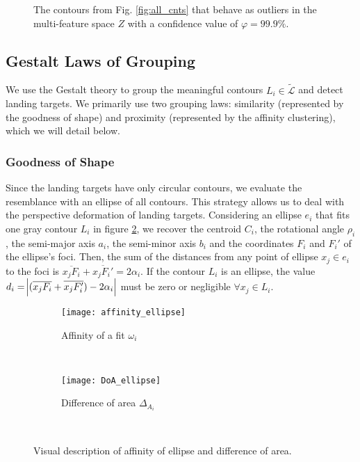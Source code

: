 \begin{figure}[!ht]
    \centering
    \caption{The contours from Fig. \ref{fig:all_cnts} that behave as outliers in the multi-feature space $Z$ with a confidence value of $\varphi=99.9\%$.}
    \label{fig:rx_cnts}
\end{figure}

\subsection{Gestalt Laws of Grouping}\label{subsec:Gestalt}
We use the Gestalt theory \citep{Wertheimer:Psycologische:1923} to group the meaningful contours $L_{i}\in \widetilde{\mathcal{L}}$ and detect landing targets. We primarily use two grouping laws: similarity (represented by the goodness of shape) and proximity (represented by the affinity clustering), which we will detail below.

\subsubsection{Goodness of Shape}\label{subsec:similarity}
Since the landing targets have only circular contours, we evaluate the resemblance with an ellipse of all contours. This strategy allows us to deal with the perspective deformation of landing targets. Considering an ellipse $e_{i}$ that fits one gray contour $L_{i}$ in figure \ref{fig:affinity}, we recover the centroid $C_{i}$, the rotational angle $\rho_i$, the semi-major axis $a_i$, the semi-minor axis $b_i$ and the coordinates $F_{i}$ and $F_{i}'$ of the ellipse's foci. Then, the sum of the distances from any point of ellipse $x_{j}\in e_{i}$ to the foci is $\overline{x_{j}F_{i}}+\overline{x_{j}F_{i}'}=2\alpha_{i}$. If the contour $L_{i}$ is an ellipse, the value $d_{i}=\abs{(\overline{x_{j}F_{i}}+\overline{x_{j}F_{i}'})-2\alpha_{i} }$ must be zero or negligible $\forall x_{j}\in L_{i}$. 

\begin{figure}[ht]
    \centering
    \begin{subfigure}[b]{0.45\textwidth}
        \texttt{[image: affinity\_ellipse]}
        \caption{Affinity of a fit $\omega_{i}$}
        \label{fig:affinity}
    \end{subfigure}
    ~ %
    \begin{subfigure}[b]{0.5\textwidth}
        \texttt{[image: DoA\_ellipse]}
        \caption{Difference of area $\Delta_{A_{i}}$}
        \label{fig:DoA}
    \end{subfigure}\\
    \caption{Visual description of affinity of ellipse and difference of area.}\label{fig:ressemblance_ellipse}
\end{figure}

